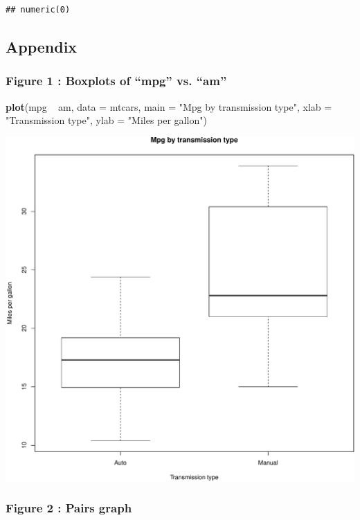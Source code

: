 \documentclass[a3paper]{article}
\newenvironment{Shaded}{\begin{snugshade}}{\end{snugshade}}
\newcommand{\KeywordTok}[1]{\textcolor[rgb]{0.13,0.29,0.53}{\textbf{{#1}}}}
\newcommand{\DataTypeTok}[1]{\textcolor[rgb]{0.13,0.29,0.53}{{#1}}}
\newcommand{\StringTok}[1]{\textcolor[rgb]{0.31,0.60,0.02}{{#1}}}
\newcommand{\NormalTok}[1]{{#1}}
\begin{document}
\begin{verbatim}
## numeric(0)
\end{verbatim}

\subsection{Appendix}\label{appendix}

\subsubsection{Figure 1 : Boxplots of ``mpg'' vs.
``am''}\label{figure-1-boxplots-of-mpg-vs.-am}

\begin{Shaded}
\begin{Highlighting}[]
\KeywordTok{plot}\NormalTok{(mpg ~}\StringTok{ }\NormalTok{am, }\DataTypeTok{data =} \NormalTok{mtcars, }\DataTypeTok{main =} \StringTok{"Mpg by transmission type"}\NormalTok{, }\DataTypeTok{xlab =} \StringTok{"Transmission type"}\NormalTok{, }\DataTypeTok{ylab =} \StringTok{"Miles per gallon"}\NormalTok{)}
\end{Highlighting}
\end{Shaded}

\includegraphics{./Report_files/figure-latex/unnamed-chunk-13.pdf}

\subsubsection{Figure 2 : Pairs graph}\label{figure-2-pairs-graph}
\end{document}
